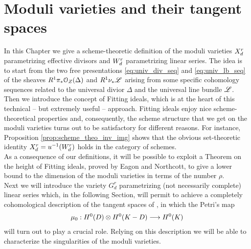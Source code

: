 
\chapter{Moduli varieties and their tangent spaces}\label{chap:moduli}



\ifpdf
    \graphicspath{{figures/PNG/}{figures/}{figures/}}
\else
    \graphicspath{{figures/EPS/}{figures/}}
\fi



In this Chapter we give a scheme-theoretic definition of the moduli varieties $X_d^r$ parametrizing effective divisors and $W_d^r$ parametrizing linear series. The idea is to start from the two free presentations \eqref{eq:univ_div_seq} and \eqref{eq:univ_lb_seq} of the sheaves $R^1 \pi_* \mathcal{O}_Z(\Delta)$ and $R^1 \nu_{*} \mathscr{L}$ arising from some specific cohomology sequences related to the universal divior $\Delta$ and the universal line bundle $\mathscr{L}$.\\
Then we introduce the concept of Fitting ideals, which is at the heart of this technical -- but extremely useful -- approach. Fitting ideals enjoy nice scheme-theoretical properties and, consequently, the scheme structure that we get on the moduli varieties turns out to be satisfactory for different reasons. For instance, Proposition \ref{prop:scheme_theo_inv_img} shows that the obvious set-theoretic identity $X_d^r = u^{-1}(W_d^r)$ holds in the category of schemes.\\
As a consequence of our definitions, it will be possible to exploit a Theorem on the height of Fitting ideals, proved by Eagon and Northcott, to give a lower bound to the dimension of the moduli varieties \moduu in terms of the \BN number $\rho$. \\
Next we will introduce the variety $G_d^r$ parametrizing (not necessarily complete) linear series which, in the following Section, will permit to achieve a completely cohomological description of the tangent spaces of \modu, in which the Petri's map 
$$ \mu_0: H^0(D)\otimes H^0(K-D) \longrightarrow H^0(K) $$ 
will turn out to play a crucial role. Relying on this description we will be able to characterize the singularities of the moduli varieties.


